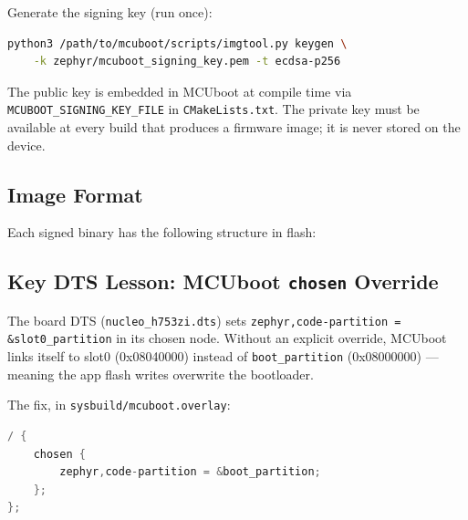 \documentclass[11pt,a4paper]{article}
\begin{document}
Generate the signing key (run once):
\begin{lstlisting}[language=bash]
python3 /path/to/mcuboot/scripts/imgtool.py keygen \
    -k zephyr/mcuboot_signing_key.pem -t ecdsa-p256
\end{lstlisting}

The public key is embedded in MCUboot at compile time via \texttt{MCUBOOT\_SIGNING\_KEY\_FILE}
in \texttt{CMakeLists.txt}. The private key must be available at every build that produces a
firmware image; it is never stored on the device.

\subsection{Image Format}

Each signed binary has the following structure in flash:

\begin{center}
\end{center}

\subsection{Key DTS Lesson: MCUboot \texttt{chosen} Override}

The board DTS (\texttt{nucleo\_h753zi.dts}) sets \texttt{zephyr,code-partition = \&slot0\_partition}
in its chosen node. Without an explicit override, MCUboot links itself to slot0 (0x08040000)
instead of \texttt{boot\_partition} (0x08000000) — meaning the app flash writes overwrite the bootloader.

The fix, in \texttt{sysbuild/mcuboot.overlay}:
\begin{lstlisting}[language=C, caption={MCUboot chosen override}]
/ {
    chosen {
        zephyr,code-partition = &boot_partition;
    };
};
\end{lstlisting}
\end{document}
